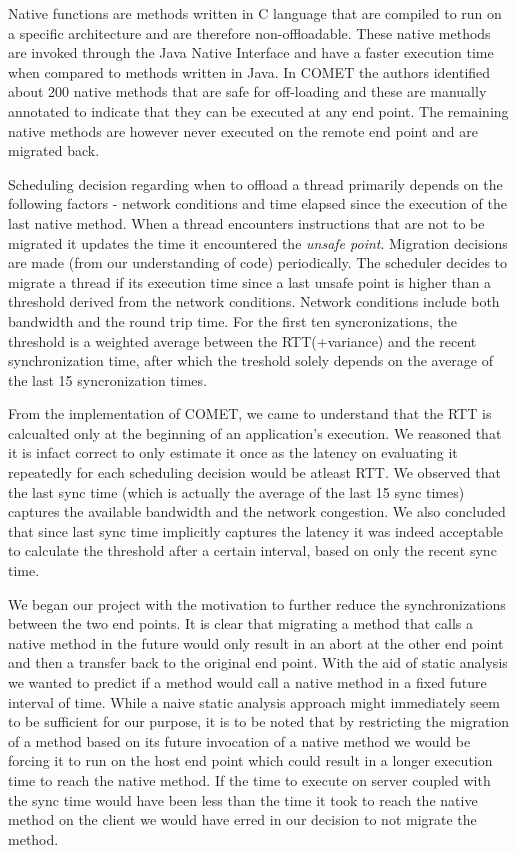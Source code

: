 Native functions are methods written in C language that are compiled to run on a 
specific architecture and are therefore non-offloadable. These native methods
are invoked through the Java Native Interface and have a faster execution time when 
compared to methods written in Java. In COMET the authors identified about 200 
native methods that are safe for off-loading and these are manually annotated to indicate 
that they can be executed at any end point. The remaining native methods are 
however never executed on the remote end point and are migrated back. 

Scheduling decision regarding when to offload a thread primarily depends on the following
factors - network conditions and time elapsed since the execution of the last 
native method. When a thread encounters instructions that are not to be migrated it 
updates the time it encountered the \textit{unsafe point}. Migration decisions are made (from our 
understanding of code) periodically. The scheduler decides to migrate a thread if 
its execution time since a last unsafe point is higher than a threshold 
derived from the network conditions. Network conditions include both bandwidth and the 
round trip time. For the first ten syncronizations, the threshold is a weighted 
average between the RTT(+variance) and the recent synchronization time, after which 
the treshold solely depends on the average of the last 15 syncronization times. 

From the implementation of COMET, we came to understand that the RTT is calcualted 
only at the beginning of an application's execution. We reasoned that it is infact
correct to only estimate it once as the latency on evaluating it repeatedly for 
each scheduling decision would be atleast RTT. We observed that the last sync 
time (which is actually the average of the last 15 sync times) captures the 
available bandwidth and the network congestion. We also concluded that since 
last sync time implicitly captures the latency it was indeed acceptable to 
calculate the threshold after a certain interval, based on only the recent sync time. 

We began our project with the motivation to further reduce the synchronizations 
between the two end points. It is clear that migrating a method that calls a 
native method in the future would only result in an abort at the other end point 
and then a transfer back to the original end point. With the aid of static analysis
we wanted to predict if a method would call a native method in a fixed future interval 
of time. While a naive static analysis approach might immediately seem to be 
sufficient for our purpose, it is to be noted that by restricting the migration of a
method based on its future invocation of a native method we would be forcing it to 
run on the host end point which could result in a longer execution time to reach the 
native method. If the time to execute on server coupled with the sync time 
would have been less than the time it took to reach the native method on the client 
we would have erred in our decision to not migrate the method. 


